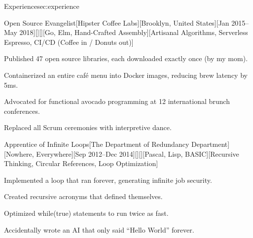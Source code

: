 \documentclass[11pt, letterpaper, extended ]{i-am-developer}
\begin{document}
\begin{devCVSection}{Experience}{sec:experience}
  \begin{devRole}{Open Source Evangelist}[Hipster Coffee
    Labs][Brooklyn, United States][Jan 2015--May
    2018][\faCoffee][\faMapMarker][Go, Elm, Hand-Crafted
    Assembly][Artisanal Algorithms, Serverless Espresso, CI/CD
    (Coffee in / Donuts out)]
    \begin{devItemize}
    \item Published 47 open source libraries, each downloaded exactly
      once (by my mom).
    \item Containerized an entire café menu into Docker images,
      reducing brew latency by 5ms.
    \item Advocated for functional avocado programming at 12
      international brunch conferences.
    \item Replaced all Scrum ceremonies with interpretive dance.
    \end{devItemize}
  \end{devRole}

  \begin{devRole}{Apprentice of Infinite Loops}[The Department of
    Redundancy Department][Nowhere, Everywhere][Sep 2012--Dec
    2014][\faToilet][\faMapMarker][Pascal, Lisp, BASIC][Recursive
    Thinking, Circular References, Loop Optimization]
    \begin{devItemize}
    \item Implemented a loop that ran forever, generating infinite job security.
    \item Created recursive acronyms that defined themselves.
    \item Optimized while(true) statements to run twice as fast.
    \item Accidentally wrote an AI that only said “Hello World” forever.
    \end{devItemize}
  \end{devRole}
\end{devCVSection}
\end{document}
